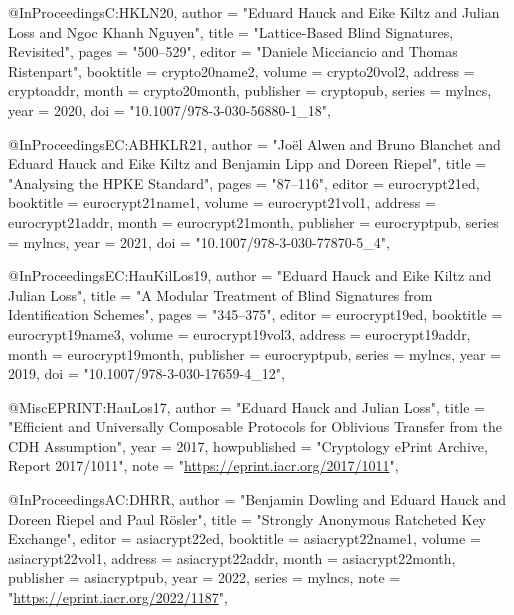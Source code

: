 @InProceedings{C:HKLN20,
  author =       "Eduard Hauck and
                  Eike Kiltz and
                  Julian Loss and
                  Ngoc Khanh Nguyen",
  title =        "Lattice-Based Blind Signatures, Revisited",
  pages =        "500--529",
  editor =       "Daniele Micciancio and Thomas Ristenpart",
  booktitle =    crypto20name2,
  volume =       crypto20vol2,
  address =      cryptoaddr,
  month =        crypto20month,
  publisher =    cryptopub,
  series =       mylncs,
  year =         2020,
  doi =          "10.1007/978-3-030-56880-1_18",
}

@InProceedings{EC:ABHKLR21,
  author =       "Jo{\"e}l Alwen and
                  Bruno Blanchet and
                  Eduard Hauck and
                  Eike Kiltz and
                  Benjamin Lipp and
                  Doreen Riepel",
  title =        "Analysing the {HPKE} Standard",
  pages =        "87--116",
  editor =       eurocrypt21ed,
  booktitle =    eurocrypt21name1,
  volume =       eurocrypt21vol1,
  address =      eurocrypt21addr,
  month =        eurocrypt21month,
  publisher =    eurocryptpub,
  series =       mylncs,
  year =         2021,
  doi =          "10.1007/978-3-030-77870-5_4",
}

@InProceedings{EC:HauKilLos19,
  author =       "Eduard Hauck and
                  Eike Kiltz and
                  Julian Loss",
  title =        "A Modular Treatment of Blind Signatures from Identification Schemes",
  pages =        "345--375",
  editor =       eurocrypt19ed,
  booktitle =    eurocrypt19name3,
  volume =       eurocrypt19vol3,
  address =      eurocrypt19addr,
  month =        eurocrypt19month,
  publisher =    eurocryptpub,
  series =       mylncs,
  year =         2019,
  doi =          "10.1007/978-3-030-17659-4_12",
}

@Misc{EPRINT:HauLos17,
  author =       "Eduard Hauck and
                  Julian Loss",
  title =        "Efficient and Universally Composable Protocols for Oblivious Transfer from the {CDH} Assumption",
  year =         2017,
  howpublished = "Cryptology ePrint Archive, Report 2017/1011",
  note =         "\url{https://eprint.iacr.org/2017/1011}",
}



@InProceedings{AC:DHRR,
  author =       "Benjamin Dowling and
                  Eduard Hauck and
                  Doreen Riepel and
                  Paul R{\"o}sler",
  title =        "Strongly Anonymous Ratcheted Key Exchange",
  editor =       asiacrypt22ed,
  booktitle =    asiacrypt22name1,
  volume =       asiacrypt22vol1,
  address =      asiacrypt22addr,
  month =        asiacrypt22month,
  publisher =    asiacryptpub,
  year =         2022,
  series =       mylncs,
  note =         "\url{https://eprint.iacr.org/2022/1187}",
}

